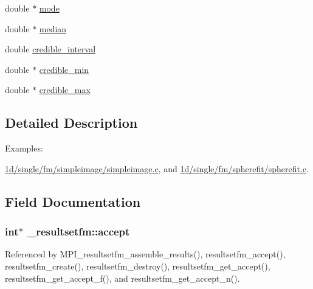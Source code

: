 \begin{DoxyCompactItemize}
\item 
double $\ast$ \hyperlink{struct__resultsetfm_a9e05b752653c91742d5e9891df70fbec}{mode}
\item 
double $\ast$ \hyperlink{struct__resultsetfm_a708c5f40ab8ed4084a94fc60daef5c44}{median}
\item 
double \hyperlink{struct__resultsetfm_a13f6eaaac5b3a4b6d60d71e43392c7f8}{credible\+\_\+interval}
\item 
double $\ast$ \hyperlink{struct__resultsetfm_a9aac08a6a424785ff64965e2e5d41a61}{credible\+\_\+min}
\item 
double $\ast$ \hyperlink{struct__resultsetfm_a046d3a408cc9e597d4846731fa1fc717}{credible\+\_\+max}
\end{DoxyCompactItemize}


\subsection{Detailed Description}
\begin{Desc}
\item[Examples\+: ]\par
\hyperlink{1d_2single_2fm_2simpleimage_2simpleimage_8c-example}{1d/single/fm/simpleimage/simpleimage.\+c}, and \hyperlink{1d_2single_2fm_2spherefit_2spherefit_8c-example}{1d/single/fm/spherefit/spherefit.\+c}.\end{Desc}


\subsection{Field Documentation}
\subsubsection[{\texorpdfstring{accept}{accept}}]{\setlength{\rightskip}{0pt plus 5cm}int$\ast$ \+\_\+resultsetfm\+::accept}\hypertarget{struct__resultsetfm_a5c18111a85d5580ca7a6f7d4fcbcb7d7}{}\label{struct__resultsetfm_a5c18111a85d5580ca7a6f7d4fcbcb7d7}


Referenced by M\+P\+I\+\_\+resultsetfm\+\_\+assemble\+\_\+results(), resultsetfm\+\_\+accept(), resultsetfm\+\_\+create(), resultsetfm\+\_\+destroy(), resultsetfm\+\_\+get\+\_\+accept(), resultsetfm\+\_\+get\+\_\+accept\+\_\+f(), and resultsetfm\+\_\+get\+\_\+accept\+\_\+n().

